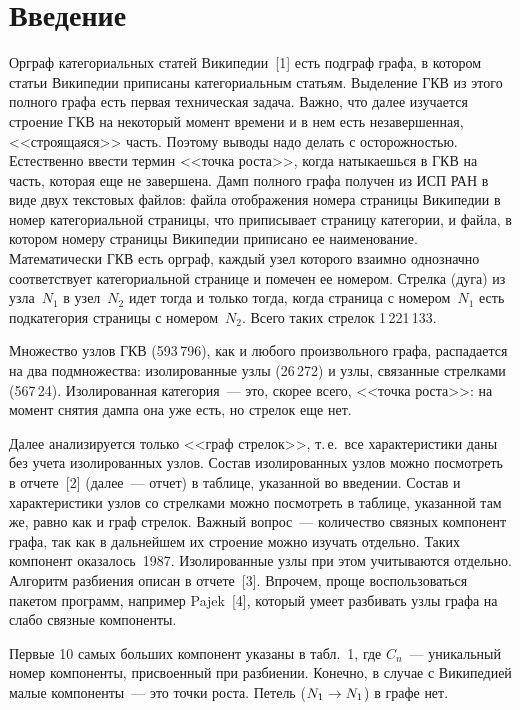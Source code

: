       \begin{multicols}{2}

            \label{st\stat}
            
\section{Введение}

Орграф категориальных статей Википедии~[1] есть подграф графа, в котором статьи 
Википедии приписаны категориальным статьям. Выделение ГКВ из этого полного 
графа есть первая техническая задача. Важно, что далее изучается строение ГКВ 
на некоторый момент времени и в нем есть незавершенная, <<строящаяся>> часть. 
Поэтому выводы надо делать с осторожностью. Естественно ввести термин <<точка 
роста>>, когда натыкаешься в ГКВ на часть, которая еще не завершена. Дамп 
полного графа получен из ИСП РАН в виде двух текстовых файлов: файла 
отображения номера страницы Википедии в номер категориальной страницы, что 
приписывает страницу категории, и файла, в котором номеру страницы Википедии 
приписано ее наименование. Математически ГКВ есть орграф, каждый узел которого 
взаимно однозначно соответствует категориальной странице и помечен ее номером. 
Стрелка (дуга) из узла~$N_1$ в узел~$N_2$ идет тогда и только тогда, когда 
страница с номером~$N_1$ есть подкатегория страницы с номером~$N_2$. Всего 
таких стрелок 1\,221\,133.
   
   Множество узлов ГКВ (593\,796), как и любого произвольного графа, распадается 
на два подмножества: изолированные узлы (26\,272) и узлы, связанные стрелками (567\,24). 
Изолированная категория~--- это, скорее всего, <<точка роста>>: на момент снятия 
дампа она уже есть, но стрелок еще нет.
   
   Далее анализируется только <<граф стрелок>>, т.\,е.\ все характеристики даны без учета 
изолированных узлов. Состав изолированных узлов можно по\-смот\-реть в отчете~[2] 
   (далее~--- отчет) в таблице, указанной во введении. Состав и характеристики узлов со 
стрелками можно посмотреть в таблице, указанной там же, равно как и граф стрелок. 
Важный вопрос~--- количество связных компонент графа, так как в дальнейшем их строение 
можно изучать отдельно. Таких компонент оказалось~1987. Изолированные узлы при этом 
учитываются отдельно. Алгоритм разбиения описан в отчете~[3]. Впрочем, проще 
воспользоваться пакетом программ, например Pajek~[4], который умеет разбивать узлы 
графа на слабо связные компоненты.
   
   Первые 10 самых больших компонент указаны в табл.~1,
где $C_n$~--- уникальный номер компоненты, присвоенный при разбиении. Конечно, в 
случае с Википедией малые компоненты~--- это точки роста. Петель ($N_1\hm\rightarrow 
N_1$) в графе нет. 
   

\end{multicols}

